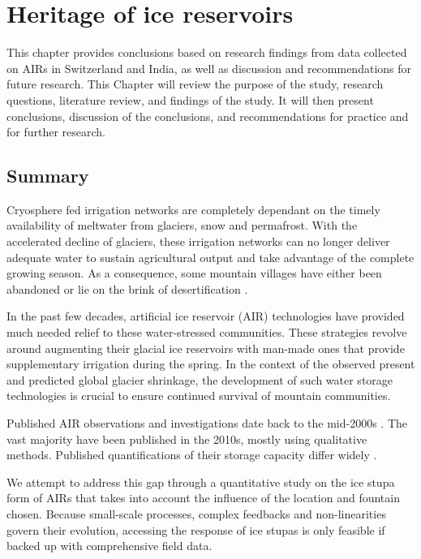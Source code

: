 \chapter{Heritage of ice reservoirs}

This chapter provides conclusions based on research findings from data collected on AIRs in Switzerland and India,
as well as discussion and recommendations for future research. This Chapter will review the purpose of the
study, research questions, literature review, and findings of the study. It will then present conclusions,
discussion of the conclusions, and recommendations for practice and for further research.

\section{Summary}

Cryosphere fed irrigation networks are completely dependant on the timely availability of meltwater from
glaciers, snow and permafrost. With the accelerated decline of glaciers, these irrigation networks can no longer
deliver adequate water to sustain agricultural output and take advantage of the complete growing season. As a
consequence, some mountain villages have either been abandoned or lie on the brink of desertification
\cite{grossmanHimalayanGlaciersMelt2015}.

In the past few decades, artificial ice reservoir (AIR) technologies have provided much needed relief to these
water-stressed communities. These strategies revolve around augmenting their glacial ice reservoirs with
man-made ones that provide supplementary irrigation during the spring. In the context of the observed present
and predicted global glacier shrinkage, the development of such water storage technologies is crucial to ensure
continued survival of mountain communities.

Published AIR observations and investigations date back to the mid-2000s \cite{tveitenGlacierGrowingLocal2007}.
The vast majority have been published in the 2010s, mostly using qualitative methods. Published quantifications
of their storage capacity differ widely \citep{baglaArtificialGlaciersHelp1998, norphelSnowWaterHarvesting2015,
nusserSociohydrologyArtificialGlaciers2019}.

We attempt to address this gap through a quantitative study on the ice stupa form of AIRs that takes into
account the influence of the location and fountain chosen. Because small-scale processes, complex feedbacks and
non-linearities govern their evolution, accessing the response of ice stupas is only feasible if backed up with
comprehensive field data. 

